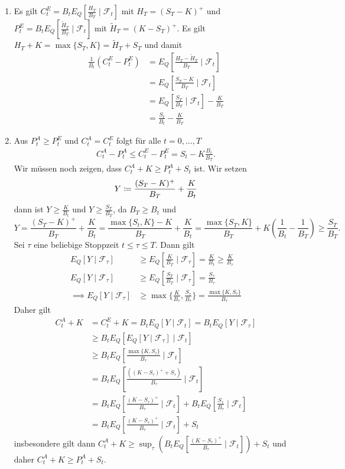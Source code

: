 \documentclass[a4paper,twoside,DIV15,BCOR12mm]{scrbook}
\newcommand{\cF}{\mathcal F}
\begin{document}
\begin{beweis}
\begin{enumerate}
\item Es gilt $C_t^E = B_t E_Q[\frac{H_T}{B_T}\mid \cF_t]$ mit $H_T = (S_T - K)^+$ und $P_t^E = B_tE_Q[\frac{\tilde H_T}{B_T} \mid \cF_t]$ mit $\tilde H_T = (K-S_T)^+$. Es gilt $H_T+K=\max\{S_T,K\} = \tilde H_T + S_T$ und damit
\begin{align*}
\frac 1 {B_t} (C_t^E - P_t^E) &= E_Q[\frac{H_T - \tilde H_T}{B_T}\mid \cF_t]\\
 & = E_Q[\frac{S_T - K}{B_T}\mid \cF_t] \\
&= E_Q[\frac{S_T}{B_T}\mid \cF_t] - \frac{K}{B_T} \\
&= \frac{S_t}{B_t} - \frac{K}{B_T}
\end{align*}
\item Aus $P_t^A \ge P_t^E$ und $C_t^A = C_t^E$ folgt für alle $t=0,\ldots,T$ 
\begin{align*}
C_t^A - P_t^A \le C_t^E - P_t^E = S_t - K\frac{B_t}{B_T}.
\end{align*}
Wir müssen noch zeigen, dass $C_t^A + K \ge P_t^A + S_t$ ist. Wir setzen 
\[
Y \da \frac{(S_T-K)^+}{B_T} + \frac K {B_t}
\]
dann ist $Y \ge \frac{K}{B_t}$ und $Y\ge \frac{S_T}{B_T}$, da  $B_T\ge B_t$ und
\[
Y = \frac{(S_T-K)^+}{B_T} + \frac K {B_t} = \frac{\max\{S_t,K\}-K}{B_T} + \frac K{B_t} = \frac{\max\{S_T,K\}}{B_T} + K(\frac{1}{B_t} - \frac 1 {B_T}) \ge \frac{S_T}{B_T}.
\]
Sei $\tau$ eine beliebige Stoppzeit $t\le \tau \le T$. Dann gilt
\begin{align*}
E_Q[Y\mid \cF_\tau] &\ge E_Q[\frac{K}{B_T} \mid \cF_\tau] = \frac{K}{B_t} \ge \frac{K}{B_\tau}\\
E_Q[Y\mid \cF_\tau] &\ge E_Q[\frac{S_T}{B_T} \mid \cF_\tau] = \frac{S_\tau}{B_\tau} \\
\implies E_Q[Y\mid \cF_\tau] & \ge \max\{\frac{K}{B_\tau}, \frac{S_\tau}{B_\tau}\} = \frac{\max\{K,S_\tau\}}{B_\tau}
\end{align*}
Daher gilt 
\begin{align*}
C_t^A + K &= C_t^E + K = B_t E_Q[Y\mid \cF_t] = B_t E_Q[Y\mid \cF_\tau] \\
&\ge B_t E_Q[ E_Q[Y\mid \cF_\tau ] \mid \cF_t] \\
&\ge B_t E_Q[ \frac{\max\{K,S_\tau\}}{B_\tau} \mid \cF_t] \\
&= B_t E_Q[\frac{( (K-S_\tau)^+ + S_\tau)}{B_\tau}  \mid \cF_t] \\
&= B_t E_Q[ \frac{(K-S_\tau)^+}{B_\tau} \mid \cF_t ] + B_t E_Q[\frac{S_\tau}{B_\tau}\mid \cF_t] \\
&= B_t E_Q[ \frac{(K-S_\tau)^+}{B_\tau} \mid \cF_t ] + S_t
\end{align*}
insbesondere gilt dann $C_t^A + K \ge \sup_{\tau} (B_t E_Q[\frac{(K-S_\tau)^+}{B_\tau}\mid \cF_t]) + S_t$ und daher $C_t^A + K \ge P_t^A + S_t$.
\end{enumerate}
\end{beweis}
\end{document}
